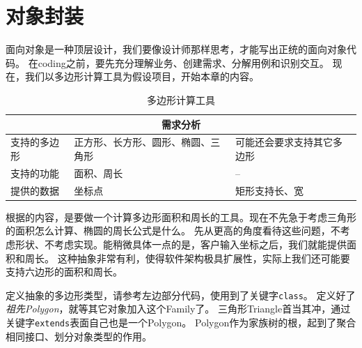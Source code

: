 \section{对象封装}
面向对象是一种顶层设计，我们要像设计师那样思考，才能写出正统的面向对象代码。
在coding之前，要先充分理解业务、创建需求、分解用例和识别交互。
现在，我们以多边形计算工具为假设项目，开始本章的内容。
\begin{table}[!htbp]\centering
\begin{tabular}{|p{3cm}|p{4cm}|p{4cm}|}
\hline
\multicolumn{3}{|c|}{需求分析}\\
\hline
支持的多边形&正方形、长方形、圆形、椭圆、三角形&可能还会要求支持其它多边形\\
\hline
支持的功能&面积、周长&--\\
\hline
提供的数据&坐标点&矩形支持长、宽\\
\hline
\end{tabular}
\caption{多边形计算工具}
\label{table:part1_oo_polygon}
\end{table}


根据的内容，是要做一个计算多边形面积和周长的工具。现在不先急于考虑三角形的面积怎么计算、椭圆的周长公式是什么。
先从更高的角度看待这些问题，不考虑形状、不考虑实现。能稍微具体一点的是，客户输入坐标之后，我们就能提供面积和周长。
这种抽象非常有利，使得软件架构极具扩展性，实际上我们还可能要支持六边形的面积和周长。

定义抽象的多边形类型，请参考左边部分代码，使用到了关键字\lstinline{class}。
定义好了\emph{祖先Polygon}，就等其它对象加入这个Family了。
三角形Triangle首当其冲，通过关键字\lstinline{extends}表面自己也是一个Polygon。
Polygon作为家族树的根，起到了聚合相同接口、划分对象类型的作用。

\begin{center}
\begin{minipage}
{\textwidth}\begin{parcolumns}{2}
\colplacechunks
\end{parcolumns}\end{minipage}\end{center}


